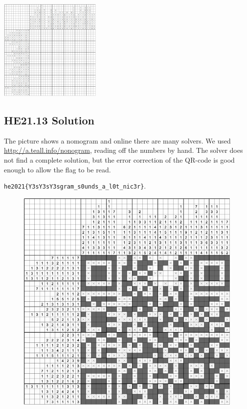 \documentclass[english,a4paper,nols,noindent]{tufte-handout}
\begin{document}
\begin{marginfigure}
    \includegraphics[width=50mm]{ch13/nonobunnygram.png}
\end{marginfigure}


\hypertarget{he21.13-solution}{%
\subsection{HE21.13 Solution}\label{he21.13-solution}}

\noindent The picture shows a nomogram and online there are many
solvers.  We used \url{http://a.teall.info/nonogram}, reading off the
numbers by hand.  The solver does not find a complete solution, but
the error correction of the QR-code is good enough to allow the flag
to be read.

\verb+he2021{Y3sY3sY3sgram_s0unds_a_l0t_nic3r}+.
\begin{figure}
    \includegraphics[width=150mm]{ch13/solution13.png}
\end{figure}
\end{document}
